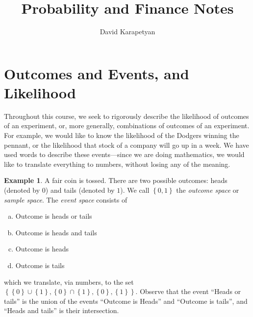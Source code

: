 \documentclass[12pt]{article}
\theoremstyle{plain}
\theoremstyle{definition}
\newtheorem*{example}{Example}
\theoremstyle{remark}
\numberwithin{equation}{section}  %
\begin{document}
\title{Probability and Finance Notes}
\author{David Karapetyan}
\date{}
\maketitle
\newpage
\setcounter{tocdepth}{2}
\setcounter{secnumdepth}{2}
\tableofcontents
\newpage
\section{Outcomes and Events, and Likelihood}
Throughout this course, we seek to rigorously describe the likelihood of
outcomes of an experiment, or, more generally, combinations of outcomes of an experiment.
For example, we would like to know the likelihood of the Dodgers
winning the pennant, or the likelihood that stock of a company will go up
in a week. We have used words to describe these events---since we are doing
mathematics, we would like to translate everything to numbers, without losing
any of the meaning.
\begin{example}
    A fair coin is tossed. There are two possible outcomes: heads (denoted by $0$) 
    and tails (denoted by $1$). We call $ \left\{ 0,1 \right\} $ the \emph{outcome
    space} or \emph{sample space}. The \emph{event space} consists of
    \begin{enumerate}[(a)]
        \item Outcome is heads or tails
        \item Outcome is heads and tails
        \item Outcome is heads
        \item Outcome is tails
    \end{enumerate}
    which we translate, via numbers, to the set $ \left\{ \left\{ 0 \right\} \cup
        \left\{ 1 \right\}, \left\{ 0 \right\} \cap \left\{ 1 \right\} , \left\{ 0
    \right\} , \left\{ 1 \right\} \right \}$.
    Observe that the event ``Heads or tails'' is the union of the events
    ``Outcome is Heads'' and ``Outcome is tails'', and ``Heads and tails'' is
    their intersection.
\end{example}	
\end{document}
